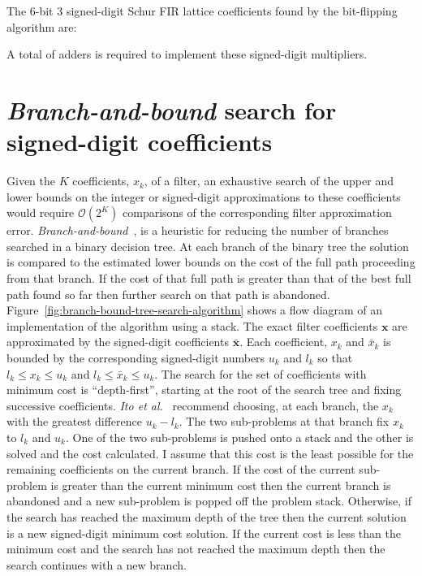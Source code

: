 \documentclass[a4paper,twoside,10pt,english]{report}
\begin{document}
The 6-bit 3 signed-digit Schur FIR lattice coefficients found by the 
bit-flipping algorithm are:
\begin{small}

\end{small}
A total of adders is
required to implement these signed-digit multipliers.
\clearpage 
\section{\label{sec:branch-bound-search-signed-digit-coefficients}\emph{Branch-and-bound} search for signed-digit coefficients}
Given the $K$ coefficients, $x_{k}$, of a filter, an exhaustive search of the
upper and lower bounds on the integer or signed-digit approximations to these
coefficients would require $\mathcal{O}\left(2^{K}\right)$ comparisons of the
corresponding filter approximation error.
\emph{Branch-and-bound}~\cite{LandDoig_AutomaticMethodSolvingDiscreteProgrammingProblems},
\cite[p.627]{Sedgewick_AlgorithmsInCPlusPlus} is a heuristic for reducing the
number of branches searched in a binary decision tree. At each branch of the
binary tree the solution is compared to the estimated lower bounds on the cost
of the full path proceeding from that branch. If the cost of that full path is
greater than that of the best full path found so far then further search on
that path is abandoned.  Figure~\ref{fig:branch-bound-tree-search-algorithm}
shows a flow diagram of an implementation of the algorithm using a stack. The
exact filter coefficients $\boldsymbol{x}$ are approximated by the
signed-digit coefficients $\bar{\boldsymbol{x}}$. Each coefficient, $x_{k}$
and $\bar{x}_{k}$ is bounded by the corresponding signed-digit numbers $u_{k}$
and $l_{k}$ so that $l_{k}\le{}x_{k}\le{}u_{k}$ and
$l_{k}\le{}\bar{x}_{k}\le{}u_{k}$. The search for the set of coefficients with
minimum cost is ``depth-first'', starting at the root of the search tree and
fixing successive coefficients.  \emph{Ito et
  al.}~\cite{Ito_PowersOfTwoAllocationFIR} recommend choosing, at each branch,
the $x_{k}$ with the greatest difference $u_{k}-l_{k}$. The two sub-problems
at that branch fix $x_{k}$ to $l_{k}$ and $u_{k}$. One of the two sub-problems
is pushed onto a stack and the other is solved and the cost calculated. I
assume that this cost is the least possible for the remaining coefficients on
the current branch. If the cost of the current sub-problem is greater than the
current minimum cost then the current branch is abandoned and a new
sub-problem is popped off the problem stack. Otherwise, if the search has
reached the maximum depth of the tree then the current solution is a new
signed-digit minimum cost solution. If the current cost is less than the
minimum cost and the search has not reached the maximum depth then the search
continues with a new branch.
\end{document}
